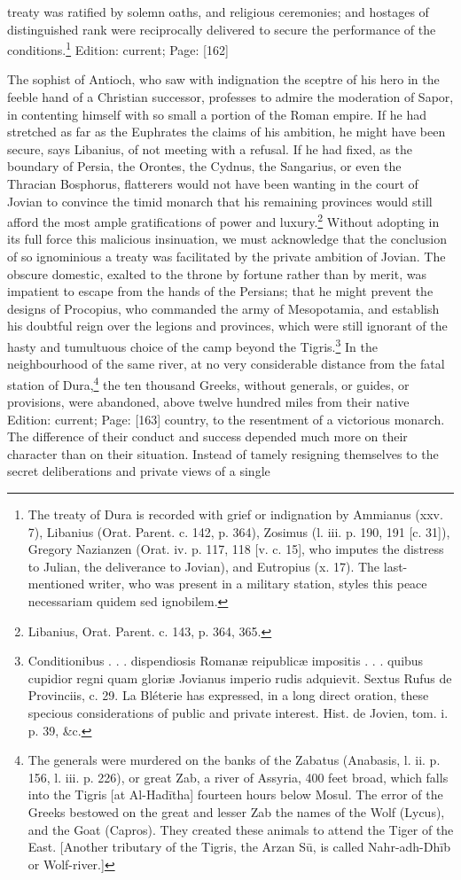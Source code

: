 treaty was ratified by solemn oaths, and religious ceremonies; and hostages of distinguished rank were reciprocally delivered to secure the performance of the conditions.\footnote{The treaty of Dura is recorded with grief or indignation by Ammianus (xxv. 7), Libanius (Orat. Parent. c. 142, p. 364), Zosimus (l. iii. p. 190, 191 [c. 31]), Gregory Nazianzen (Orat. iv. p. 117, 118 [v. c. 15], who imputes the distress to Julian, the deliverance to Jovian), and Eutropius (x. 17). The last-mentioned writer, who was present in a military station, styles this peace necessariam quidem sed ignobilem.}
Edition: current; Page: [162]

The sophist of Antioch, who saw with indignation the sceptre of his hero in the feeble hand of a Christian successor, professes to admire the moderation of Sapor, in contenting himself with so small a portion of the Roman empire. If he had stretched as far as the Euphrates the claims of his ambition, he might have been secure, says Libanius, of not meeting with a refusal. If he had fixed, as the boundary of Persia, the Orontes, the Cydnus, the Sangarius, or even the Thracian Bosphorus, flatterers would not have been wanting in the court of Jovian to convince the timid monarch that his remaining provinces would still afford the most ample gratifications of power and luxury.\footnote{Libanius, Orat. Parent. c. 143, p. 364, 365.} Without adopting in its full force this malicious insinuation, we must acknowledge that the conclusion of so ignominious a treaty was facilitated by the private ambition of Jovian. The obscure domestic, exalted to the throne by fortune rather than by merit, was impatient to escape from the hands of the Persians; that he might prevent the designs of Procopius, who commanded the army of Mesopotamia, and establish his doubtful reign over the legions and provinces, which were still ignorant of the hasty and tumultuous choice of the camp beyond the Tigris.\footnote{Conditionibus . . . dispendiosis Romanæ reipublicæ impositis . . . quibus cupidior regni quam gloriæ Jovianus imperio rudis adquievit. Sextus Rufus de Provinciis, c. 29. La Bléterie has expressed, in a long direct oration, these specious considerations of public and private interest. Hist. de Jovien, tom. i. p. 39, \&c.} In the neighbourhood of the same river, at no very considerable distance from the fatal station of Dura,\footnote{The generals were murdered on the banks of the Zabatus (Anabasis, l. ii. p. 156, l. iii. p. 226), or great Zab, a river of Assyria, 400 feet broad, which falls into the Tigris [at Al-Hadītha] fourteen hours below Mosul. The error of the Greeks bestowed on the great and lesser Zab the names of the Wolf (Lycus), and the Goat (Capros). They created these animals to attend the Tiger of the East. [Another tributary of the Tigris, the Arzan Sū, is called Nahr-adh-Dhīb or Wolf-river.]} the ten thousand Greeks, without generals, or guides, or provisions, were abandoned, above twelve hundred miles from their native Edition: current; Page: [163] country, to the resentment of a victorious monarch. The difference of their conduct and success depended much more on their character than on their situation. Instead of tamely resigning themselves to the secret deliberations and private views of a single 